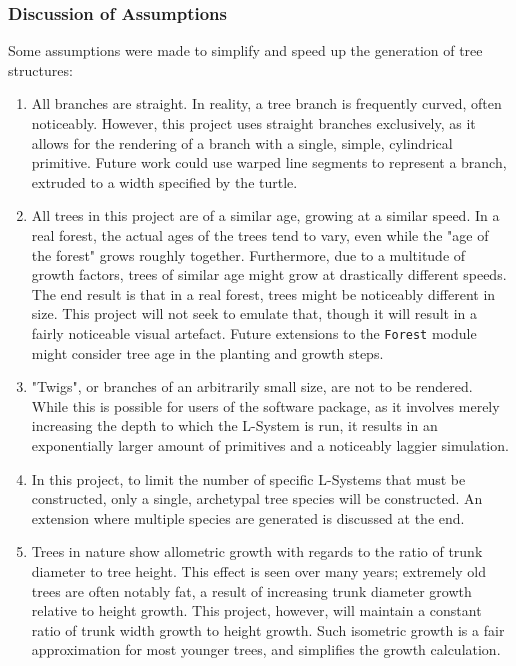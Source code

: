 \documentclass{article}
\newcommand{\tab}{\hspace*{2em}}
\begin{document}
            \subsubsection{Discussion of Assumptions}
            \label{subsubsec:assumptions}
    \tab Some assumptions were made to simplify and speed up the generation of tree structures:
\begin{enumerate}
    \item All branches are straight. In reality, a tree branch is frequently curved, often
noticeably. However, this project uses straight branches exclusively, as it allows for the
rendering of a branch with a single, simple, cylindrical primitive. Future work could use warped
line segments to represent a branch, extruded to a width specified by the turtle.

    \item All trees in this project are of a similar age, growing at a similar speed. In a real
forest, the actual ages of the trees tend to vary, even while the "age of the forest" grows
roughly together. Furthermore, due to a multitude of growth factors, trees of similar age might
grow at drastically different speeds. The end result is that in a real forest, trees might be
noticeably different in size. This project will not seek to emulate that, though it will result in
a fairly noticeable visual artefact. Future extensions to the \verb|Forest| module might consider
tree age in the planting and growth steps.

    \item "Twigs", or branches of an arbitrarily small size, are not to be rendered. While this is
possible for users of the software package, as it involves merely increasing the depth to which the
L-System is run, it results in an exponentially larger amount of primitives and a noticeably
laggier simulation.

    \item In this project, to limit the number of specific L-Systems that must be constructed, only
a single, archetypal tree species will be constructed. An extension where multiple species are
generated is discussed at the end.

    \item Trees in nature show allometric growth with regards to the ratio of trunk diameter to
tree height\cite{bugmann01}. This effect is seen over many years; extremely old trees are often
notably fat, a result of increasing trunk diameter growth relative to height growth. This project,
however, will maintain a constant ratio of trunk width growth to height growth. Such isometric
growth is a fair approximation for most younger trees, and simplifies the growth calculation.

\end{enumerate}
\end{document}
